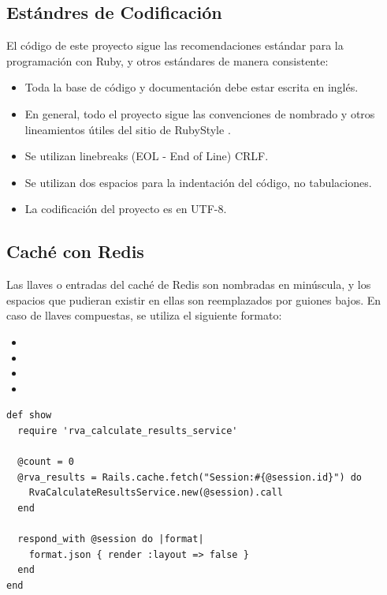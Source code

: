 \subsection{Estándres de Codificación}
El código de este proyecto sigue las recomendaciones estándar para la programación con Ruby, y otros estándares de manera consistente:
\begin{itemize}
  \item Toda la base de código y documentación debe estar escrita en inglés.
  \item En general, todo el proyecto sigue las convenciones de nombrado y otros lineamientos útiles del sitio de RubyStyle \cite{rubystyle}.
  \item Se utilizan linebreaks (EOL - End of Line) CRLF.
  \item Se utilizan dos espacios para la indentación del código, no tabulaciones.
  \item La codificación del proyecto es en UTF-8. 
\end{itemize}

\subsection{Caché con Redis}
Las llaves o entradas del caché de Redis \cite{redis} son nombradas en minúscula, y los espacios que pudieran existir en ellas son reemplazados por guiones bajos. En caso de llaves compuestas, se utiliza el siguiente formato:

\begin{itemize}
  \item {}
  \item {}
  \item {}
  \item {}
\end{itemize}

\begin{longlisting}
  \begin{verbatim}  
def show
  require 'rva_calculate_results_service'
	
  @count = 0
  @rva_results = Rails.cache.fetch("Session:#{@session.id}") do
    RvaCalculateResultsService.new(@session).call
  end
	
  respond_with @session do |format|
    format.json { render :layout => false }
  end  
end
  \end{verbatim}
\end{longlisting}


